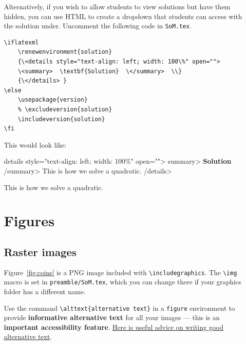 Alternatively, if you wish to allow students to view solutions but have them hidden, you can use HTML to create a dropdown that students can access with the solution under. Uncomment the following code in \texttt{SoM.tex}.

\begin{lstlisting}
\iflatexml  
    \renewenvironment{solution} 
    {\<details style="text-align: left; width: 100\%" open="">  
    \<summary>  \textbf{Solution}  \</summary>  \\} 
    {\</details> } 
\else 
    \usepackage{version}  
    % \excludeversion{solution}  
    \includeversion{solution}  
\fi 
\end{lstlisting}

This would look like:

\iflatexml  
\<details style="text-align: left; width: 100\%" open="">  \<summary>  \textbf{Solution}  \</summary>  This is how we solve a quadratic.  
    \</details> 
\else 
    \begin{solution}
        This is how we solve a quadratic. 
    \end{solution} 
\fi 




\section{Figures}
\label{demo:fig}

\subsection{Raster images}
\label{demo:fig:raster}

Figure~\ref{fig:coins} is a PNG image included with \verb|\includegraphics|. The \verb|\img| macro is set in \texttt{preamble/SoM.tex}, which you can change there if your graphics folder has a different name.

Use the command \verb|\alttext{alternative text}| in a \texttt{figure} environment to provide \textbf{informative alternative text} for all your images --- this is an \textbf{important accessibility feature}. \href{https://accessibility.huit.harvard.edu/describe-content-images}{Here is useful advice on writing good alternative text}.

